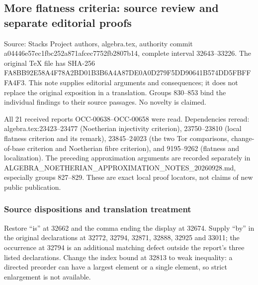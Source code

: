 \subsection{More flatness criteria: source review and separate editorial proofs}\label{algebra-proof-038-more-flatness-criteria-source-review-and-separate-editorial-proofs}

Source: Stacks Project authors, algebra.tex, authority commit a044\allowbreak{}46e5\allowbreak{}7ec1\allowbreak{}fbc2\allowbreak{}52a8\allowbreak{}71af\allowbreak{}cec7\allowbreak{}752f\allowbreak{}b280\allowbreak{}7b14, complete interval 32643--33226. The original TeX file has SHA-256 FA8B\allowbreak{}B92E\allowbreak{}58A4\allowbreak{}F78A\allowbreak{}2BD0\allowbreak{}1B3B\allowbreak{}6A4A\allowbreak{}87DE\allowbreak{}0A0D\allowbreak{}279F\allowbreak{}5DD9\allowbreak{}0641\allowbreak{}B574\allowbreak{}DD5F\allowbreak{}BFFF\allowbreak{}A4F3. This note supplies editorial arguments and consequences; it does not replace the original exposition in a translation. Groups 830--853 bind the individual findings to their source passages. No novelty is claimed.

All 21 received reports OCC-00638--OCC-00658 were read. Dependencies reread: algebra.tex:23423--23477 (Noetherian injectivity criterion), 23750--23810 (local flatness criterion and its remark), 23845--24023 (the two Tor comparisons, change-of-base criterion and Noetherian fibre criterion), and 9195--9262 (flatness and localization). The preceding approximation arguments are recorded separately in ALGEBRA\_\allowbreak{}NOETHERIAN\_\allowbreak{}APPROXIMATIO\allowbreak{}N\_\allowbreak{}NOTES\_\allowbreak{}20260928.\allowbreak{}md, especially groups 827--829. These are exact local proof locators, not claims of new public publication.

\subsubsection{Source dispositions and translation treatment}\label{algebra-proof-038-source-dispositions-and-translation-treatment}

Restore ``is'' at 32662 and the comma ending the display at 32674. Supply ``by'' in the original declarations at 32772, 32794, 32871, 32888, 32925 and 33011; the occurrence at 32794 is an additional matching defect outside the report's three listed declarations. Change the index bound at 32813 to weak inequality: a directed preorder can have a largest element or a single element, so strict enlargement is not available.


